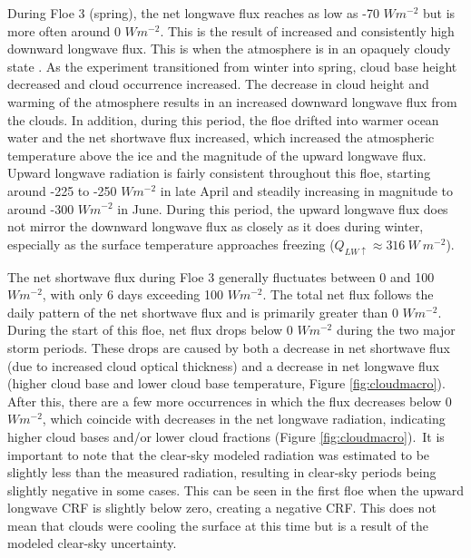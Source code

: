 During Floe 3 (spring), the net longwave flux reaches as low as -70 $Wm^{-2}$ but is more often around 0 $Wm^{-2}$. This is the result of increased and consistently high downward longwave flux. This is when the atmosphere is in an opaquely cloudy state \citep{stramler:2011, graham:2017}. As the experiment transitioned from winter into spring, cloud base height decreased and cloud occurrence increased. The decrease in cloud height and warming of the atmosphere results in an increased downward longwave flux from the clouds. In addition, during this period, the floe drifted into warmer ocean water \citep{kayser:2017} and the net shortwave flux increased, which increased the atmospheric temperature above the ice and the magnitude of the upward longwave flux. Upward longwave radiation is fairly consistent throughout this floe, starting around -225 to -250 $Wm^{-2}$ in late April and steadily increasing in magnitude to around -300 $Wm^{-2}$ in June. During this period, the upward longwave flux does not mirror the downward longwave flux as closely as it does during winter, especially as the surface temperature approaches freezing ($Q_{LW\uparrow} \approx 316~W~m^{-2}$).

The net shortwave flux during Floe 3 generally fluctuates between 0 and 100 $Wm^{-2}$, with only 6 days exceeding 100 $Wm^{-2}$. The total net flux follows the daily pattern of the net shortwave flux and is primarily greater than 0 $Wm^{-2}$. During the start of this floe, net flux drops below 0 $Wm^{-2}$ during the two major storm periods. These drops are caused by both a decrease in net shortwave flux (due to increased cloud optical thickness) and a decrease in net longwave flux (higher cloud base and lower cloud base temperature, Figure \ref{fig:cloudmacro}). After this, there are a few more occurrences in which the flux decreases below 0 $Wm^{-2}$, which coincide with decreases in the net longwave radiation, indicating higher cloud bases and/or lower cloud fractions (Figure \ref{fig:cloudmacro}). It is important to note that the clear-sky modeled radiation was estimated to be slightly less than the measured radiation, resulting in clear-sky periods being slightly negative in some cases. This can be seen in the first floe when the upward longwave CRF is slightly below zero, creating a negative CRF. This does not mean that clouds were cooling the surface at this time but is a result of the modeled clear-sky uncertainty. 

